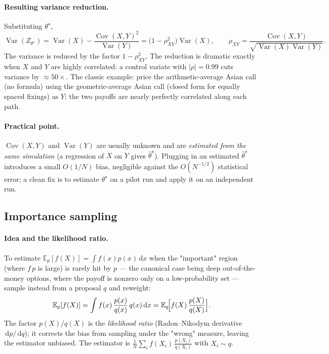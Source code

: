 \documentclass[11pt]{article}
\newcommand{\E}{\mathbb{E}}
\newcommand{\Var}{\operatorname{Var}}
\newcommand{\Cov}{\operatorname{Cov}}
\newcommand{\dd}{\,\mathrm{d}}
\begin{document}
\paragraph{Resulting variance reduction.} Substituting $\theta^\star$,
\[
\Var(Z_{\theta^\star})=\Var(X)-\frac{\Cov(X,Y)^2}{\Var(Y)}
=\bigl(1-\rho_{XY}^2\bigr)\Var(X),
\qquad
\rho_{XY}=\frac{\Cov(X,Y)}{\sqrt{\Var(X)\Var(Y)}}.
\]
The variance is reduced by the factor $1-\rho_{XY}^2$. The reduction is dramatic exactly
when $X$ and $Y$ are highly correlated: a control variate with $|\rho|=0.99$ cuts
variance by $\approx 50\times$. The classic example: price the arithmetic-average Asian
call (no formula) using the geometric-average Asian call (closed form for equally spaced
fixings) as $Y$; the two payoffs are nearly perfectly correlated along each path.

\paragraph{Practical point.} $\Cov(X,Y)$ and $\Var(Y)$ are usually unknown and are
\emph{estimated from the same simulation} (a regression of $X$ on $Y$ gives
$\widehat\theta^\star$). Plugging in an estimated $\widehat\theta^\star$ introduces a
small $O(1/N)$ bias, negligible against the $O(N^{-1/2})$ statistical error; a clean fix
is to estimate $\theta^\star$ on a pilot run and apply it on an independent run.

\subsection{Importance sampling}

\paragraph{Idea and the likelihood ratio.} To estimate
$\E_p[f(X)]=\int f(x)p(x)\dd x$ when the "important" region (where $f\,p$ is large) is
rarely hit by $p$ --- the canonical case being deep out-of-the-money options, where the
payoff is nonzero only on a low-probability set --- sample instead from a proposal $q$
and reweight:
\[
\E_p[f(X)]=\int f(x)\,\frac{p(x)}{q(x)}\,q(x)\dd x
=\E_q\!\Bigl[f(X)\,\frac{p(X)}{q(X)}\Bigr].
\]
The factor $p(X)/q(X)$ is the \emph{likelihood ratio} (Radon--Nikodym derivative
$\dd p/\dd q$); it corrects the bias from sampling under the "wrong" measure, leaving the
estimator unbiased. The estimator is
$\frac1N\sum_i f(X_i)\,\tfrac{p(X_i)}{q(X_i)}$ with $X_i\sim q$.
\end{document}
